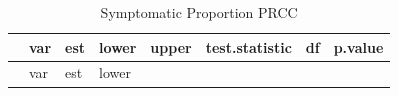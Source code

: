 \documentclass[
]{article}
\begin{document}
\begin{longtable}[]{@{}
  >{\raggedright\arraybackslash}p{}
  >{\raggedright\arraybackslash}p{}
  >{\raggedleft\arraybackslash}p{}
  >{\raggedleft\arraybackslash}p{}
  >{\raggedleft\arraybackslash}p{}
  >{\raggedleft\arraybackslash}p{}
  >{\raggedleft\arraybackslash}p{}
  >{\raggedleft\arraybackslash}p{}@{}}
\caption{Symptomatic Proportion PRCC}\tabularnewline
\toprule\noalign{}
\begin{minipage}[b]{\linewidth}\raggedright
\end{minipage} & \begin{minipage}[b]{\linewidth}\raggedright
var
\end{minipage} & \begin{minipage}[b]{\linewidth}\raggedleft
est
\end{minipage} & \begin{minipage}[b]{\linewidth}\raggedleft
lower
\end{minipage} & \begin{minipage}[b]{\linewidth}\raggedleft
upper
\end{minipage} & \begin{minipage}[b]{\linewidth}\raggedleft
test.statistic
\end{minipage} & \begin{minipage}[b]{\linewidth}\raggedleft
df
\end{minipage} & \begin{minipage}[b]{\linewidth}\raggedleft
p.value
\end{minipage} \\
\midrule\noalign{}
\endfirsthead
\toprule\noalign{}
\begin{minipage}[b]{\linewidth}\raggedright
\end{minipage} & \begin{minipage}[b]{\linewidth}\raggedright
var
\end{minipage} & \begin{minipage}[b]{\linewidth}\raggedleft
est
\end{minipage} & \begin{minipage}[b]{\linewidth}\raggedleft
lower
\end{minipage} & \begin{minipage}[b]{\linewidth}\raggedleft

\end{minipage}
\end{longtable}
\end{document}

